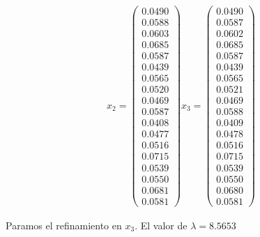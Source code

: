 \begin{equation*}
\begin{array}{cccc}
	x_{2} = 
	\left( \begin{array}{c}
    0.0490\\
    0.0588\\
    0.0603\\
    0.0685\\
    0.0587\\
    0.0439\\
    0.0565\\
    0.0520\\
    0.0469\\
    0.0587\\
    0.0408\\
    0.0477\\
    0.0516\\
    0.0715\\
    0.0539\\
    0.0550\\
    0.0681\\
    0.0581
	\end{array}\right)	
	
	x_{3} = 
	\left( \begin{array}{c}
    0.0490\\
    0.0587\\
    0.0602\\
    0.0685\\
    0.0587\\
    0.0439\\
    0.0565\\
    0.0521\\
    0.0469\\
    0.0588\\
    0.0409\\
    0.0478\\
    0.0516\\
    0.0715\\
    0.0539\\
    0.0550\\
    0.0680\\
    0.0581
	\end{array}\right)
		
	
	\end{array}
	\end{equation*}
	
	Paramos el refinamiento en $x_{3}$. El valor de $\lambda = 8.5653$
	
